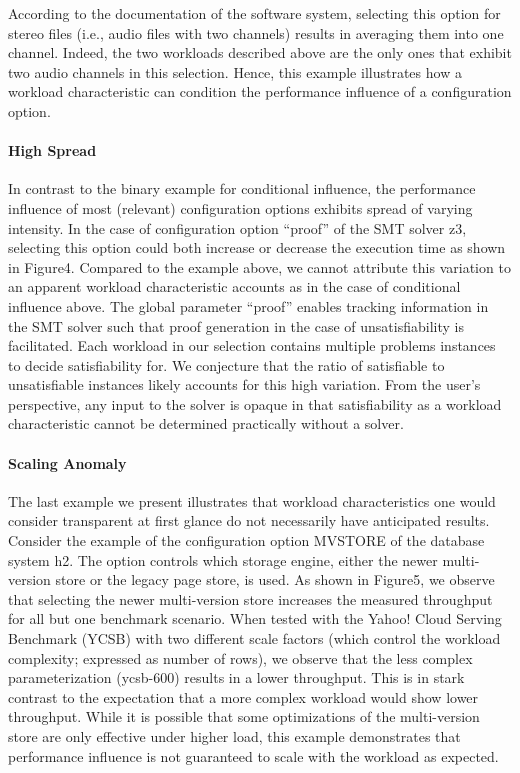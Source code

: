 {{{According to the documentation of the software system, selecting this option for stereo files (i.e., audio files with two channels) results in averaging them into one channel. Indeed, the two workloads described above are the only ones that exhibit two audio channels in this selection. Hence, this example illustrates how a workload  characteristic can condition the performance influence of a configuration option. 

\paragraph{High Spread} In contrast to the binary example for conditional influence, the performance influence of most (relevant) configuration options exhibits spread of varying intensity. In the case of configuration option “proof” of the SMT solver z3, selecting this option could both increase or decrease the execution time as shown in Figure4. Compared to the example above, we cannot attribute this variation to an apparent workload characteristic accounts as in the case of conditional influence above. 
The global parameter “proof” enables tracking information in the SMT solver such that proof generation in the case of unsatisfiability is facilitated. Each workload in our selection contains multiple problems instances to decide satisfiability for. We conjecture that the ratio of satisfiable to unsatisfiable instances likely accounts for this high variation. From the user’s perspective, any input to the solver is opaque in that satisfiability as a workload characteristic cannot be determined practically without a solver. 

\paragraph{Scaling Anomaly} The last example we present illustrates that workload characteristics one would consider transparent at first glance do not necessarily have anticipated results. Consider the example of the configuration option MVSTORE of the database system h2. The option controls which storage engine, either the newer multi-version store or the legacy page store, is used. As shown in Figure5, we observe that selecting the newer multi-version store increases the measured throughput for all but one benchmark scenario. When tested with the Yahoo! Cloud Serving Benchmark (YCSB) with two different scale factors (which control the workload complexity; expressed as number of rows), we observe that the less complex parameterization (ycsb-600) results in a lower throughput. This is in stark contrast to the expectation that a more complex workload would show lower throughput. While it is possible that some optimizations of the multi-version store are only effective under higher load, this example demonstrates that performance influence is not guaranteed to scale with the workload as expected.  

}}}
